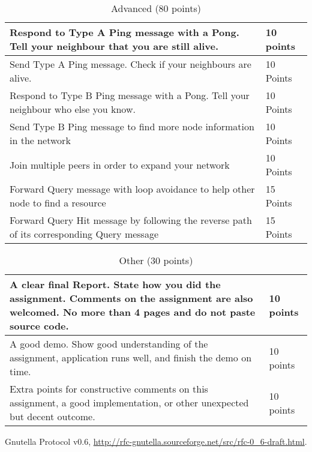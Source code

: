\documentclass[12pt, a4paper]{article}
\begin{document}
\begin{table}[htdp]
\caption{Advanced (80 points)}
\begin{center}
\begin{tabular}{|p{12cm}|p{2cm}|}
\hline
Respond to Type A Ping message with a Pong.
Tell your neighbour that you are still alive. & 10 points \\
\hline
Send Type A Ping message.
Check if your neighbours are alive. & 10 Points \\
\hline
Respond to Type B Ping message with a Pong.
Tell your neighbour who else you know. & 10 Points \\
\hline
Send Type B Ping message to find more node information in the network & 10 Points \\
\hline
Join multiple peers in order to expand your network & 10 Points \\
\hline
Forward Query message with loop avoidance to help other node to find a resource & 15 Points \\
\hline
Forward Query Hit message by following the reverse path of its corresponding Query message & 15 Points \\
\hline
\end{tabular}
\end{center}
\end{table}

\begin{table}[htdp]
\caption{Other (30 points)}
\begin{center}
\begin{tabular}{|p{12cm}|p{2cm}|}
\hline
A clear final Report.
State how you did the assignment.
Comments on the assignment are also welcomed.
No more than 4 pages and do not paste source code. & 10 points \\
\hline
A good demo.
Show good understanding of the assignment, application runs well, and finish the demo on time. & 10 points \\
\hline
Extra points for constructive comments on this assignment, a good implementation, or other unexpected but decent outcome. & 10 points \\

\hline
\end{tabular}
\end{center}
\end{table}


\FloatBarrier

\begin{thebibliography}{1}

Gnutella Protocol v0.6, \url{http://rfc-gnutella.sourceforge.net/src/rfc-0\_6-draft.html}.

\end{thebibliography}
\end{document}
